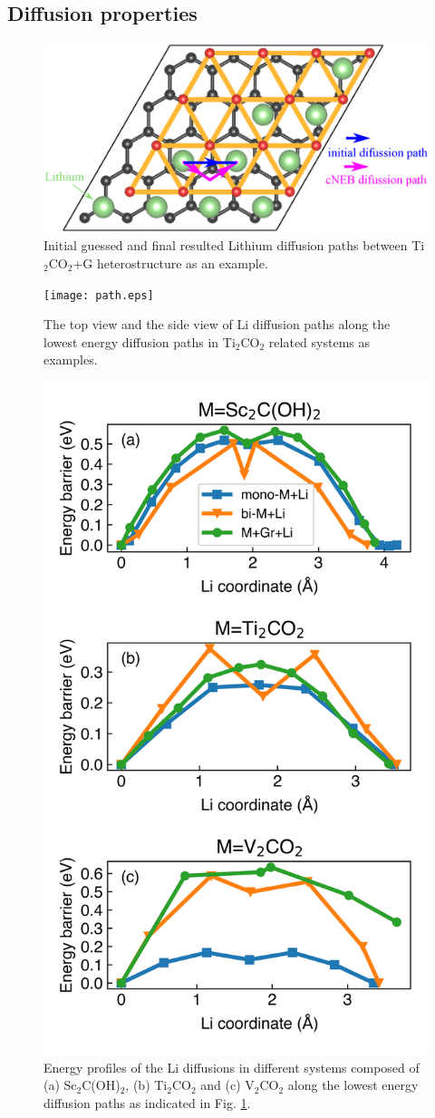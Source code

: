 \subsection{Diffusion properties}

\begin{figure}[htbp]
\centering
\includegraphics[width=0.8\linewidth]{sites_path.eps}%
\caption{Initial guessed and final resulted Lithium diffusion paths between Ti$_2$CO$_2$+G heterostructure as an example. }
\end{figure}

\begin{figure}[htbp]
\centering
\texttt{[image: path.eps]}%
\caption{The top view and the side view of Li diffusion paths along the lowest energy diffusion paths in Ti$_2$CO$_2$ related systems as examples. \label{path}}
\end{figure}

\begin{figure}[htbp]
\centering
\includegraphics[width=0.7\linewidth]{Li_barrier.png}%
\caption{Energy profiles of the Li diffusions in different systems composed of (a) Sc$_2$C(OH)$_2$, (b) Ti$_2$CO$_2$ and (c) V$_2$CO$_2$ along the lowest energy diffusion paths as indicated in Fig. \ref{path}. \label{barrier}}
\end{figure}

